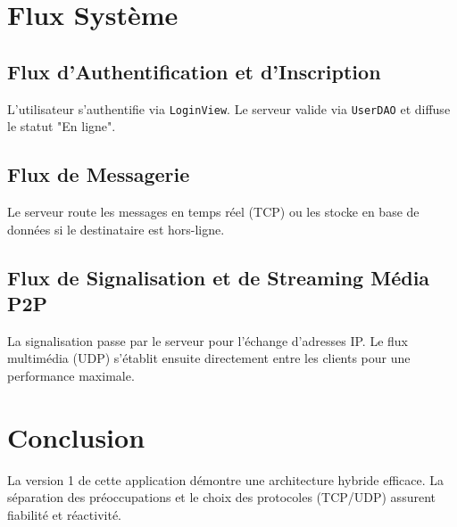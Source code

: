\documentclass[12pt,a4paper]{article}
\begin{document}
\section{Flux Système}

\subsection{Flux d'Authentification et d'Inscription}
L'utilisateur s'authentifie via \texttt{LoginView}. Le serveur valide via \texttt{UserDAO} et diffuse le statut "En ligne".

\subsection{Flux de Messagerie}
Le serveur route les messages en temps réel (TCP) ou les stocke en base de données si le destinataire est hors-ligne.

\subsection{Flux de Signalisation et de Streaming Média P2P}
La signalisation passe par le serveur pour l'échange d'adresses IP. Le flux multimédia (UDP) s'établit ensuite directement entre les clients pour une performance maximale.

\section{Conclusion}
La version 1 de cette application démontre une architecture hybride efficace. La séparation des préoccupations et le choix des protocoles (TCP/UDP) assurent fiabilité et réactivité.
\end{document}
